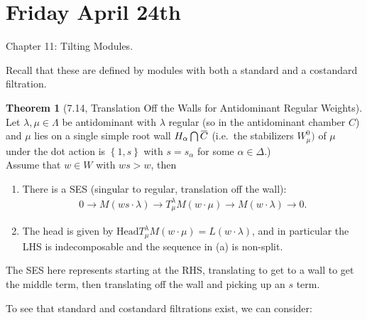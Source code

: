 \documentclass[11pt]{scrartcl}
\theoremstyle{definition}
\theoremstyle{theorem}
\newtheorem{theorem}{Theorem}[section]
\theoremstyle{proof}
\theoremstyle{definition}
\theoremstyle{break}
\theoremstyle{problem}
\providecommand{\tightlist}{%
  \setlength{\itemsep}{0pt}\setlength{\parskip}{0pt}}
\newcommand{\intersect}[0]{\bigcap}
\newcommand{\theset}[1]{\left\{{#1}\right\}}
\renewcommand{\bar}[1]{\mkern 1.5mu\overline{\mkern-1.5mu#1\mkern-1.5mu}\mkern 1.5mu}
\renewcommand{\to}[0]{\longrightarrow}
\begin{document}
\hypertarget{friday-april-24th}{%
\section{Friday April 24th}\label{friday-april-24th}}

Chapter 11: Tilting Modules.

Recall that these are defined by modules with both a standard and a
costandard filtration.

\begin{theorem}[7.14, Translation Off the Walls for Antidominant Regular Weights]

Let \(\lambda, \mu \in \Lambda\) be antidominant with \(\lambda\)
regular (so in the antidominant chamber \(C\)) and \(\mu\) lies on a
single simple root wall \(H_\alpha \intersect \bar C\) (i.e.~the
stabilizers \(W_\mu^0)\) of \(\mu\) under the dot action is
\(\theset{1, s}\) with \(s = s_\alpha\) for some
\(\alpha \in \Delta\).)\\
Assume that \(w\in W\) with \(ws > w\), then

\begin{enumerate}
\def\labelenumi{\alph{enumi}.}
\tightlist
\item
  There is a SES (singular to regular, translation off the wall):
  \begin{align*} 0 \to M(ws \cdot \lambda ) \to T_{\mu}^\lambda M(w\cdot \mu) \to M(w\cdot \lambda) \to 0.\end{align*}
\item
  The head is given by
  \(\text{Head} T_{\mu}^\lambda M(w\cdot \mu) = L(w\cdot \lambda)\), and
  in particular the LHS is indecomposable and the sequence in (a) is
  non-split.
\end{enumerate}

\end{theorem}

The SES here represents starting at the RHS, translating to get to a
wall to get the middle term, then translating off the wall and picking
up an \(s\) term.

To see that standard and costandard filtrations exist, we can consider:
\end{document}
